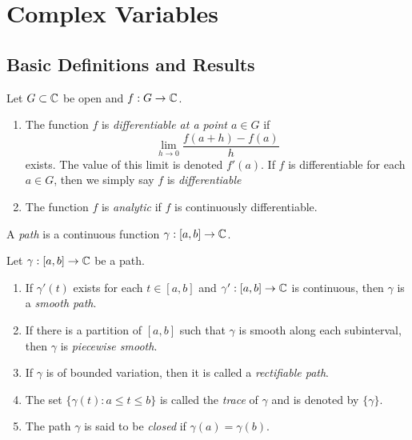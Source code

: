 

\chapter{Complex Variables}

\section{Basic Definitions and Results}

\begin{definition}
	Let $G \subset \mathbb{C}$ be open and $f:G \rightarrow \mathbb{C}$.
	\mbox{}
	\begin{enumerate}[label = (\arabic*),itemsep=1pt,topsep=3pt]
		\item The function $f$ is \emph{differentiable at a point $a \in G$} if
			\[
				\lim_{h \rightarrow 0}\frac{f(a+h) - f(a)}{h}
			\] 
			exists. The value of this limit is denoted $f'(a)$. If $f$ is differentiable for each $a \in G$, then we simply say $f$ is \emph{differentiable}
		\item The function $f$ is \emph{analytic} if $f$ is continuously differentiable.
	\end{enumerate}
\end{definition}

\begin{definition}
	A \emph{path} is a continuous function $\gamma:[a,b] \rightarrow \mathbb{C}$.
\end{definition}

\begin{definition}
	Let $\gamma:[a,b] \rightarrow \mathbb{C}$ be a path.
	\mbox{}
	\begin{enumerate}[label = (\arabic*),itemsep=1pt,topsep=3pt]
		\item If $\gamma'(t)$ exists for each $t \in [a,b]$ and $\gamma':[a,b] \rightarrow \mathbb{C}$ is continuous, then $\gamma$ is a \emph{smooth path}.
		\item If there is a partition of $[a,b]$ such that $\gamma$ is smooth along each subinterval, then $\gamma$ is \emph{piecewise smooth}.
		\item If $\gamma$ is of bounded variation, then it is called a \emph{rectifiable path}.
		\item The set $\{\gamma(t):a \leq t \leq b\}$ is called the \emph{trace} of $\gamma$ and is denoted by $\{\gamma\}$.
		\item The path $\gamma$ is said to be \emph{closed} if $\gamma(a) = \gamma(b)$.
	\end{enumerate}
\end{definition}

